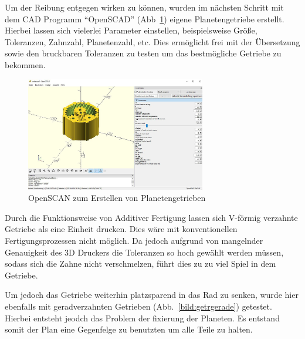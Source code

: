 Um der Reibung entgegen wirken zu können, wurden im nächsten Schritt mit dem CAD Programm ``OpenSCAD'' (Abb~\ref{bild:gearversion2}) eigene Planetengetriebe erstellt.
Hierbei lassen sich vielerlei Parameter einstellen, beispielsweise Größe, Toleranzen, Zahnzahl, Planetenzahl, etc.
Dies ermöglicht frei mit der Übersetzung sowie den bruckbaren Toleranzen zu testen um das bestmögliche Getriebe zu bekommen.
\begin{figure}[!ht]
	\centering
	\includegraphics[width=0.7\textwidth]{bilder/GetriebeVersion2.jpg}
	\caption{OpenSCAN zum Erstellen von Planetengetrieben}
	\label{bild:gearversion2}
\end{figure}

Durch die Funktionsweise von Additiver Fertigung lassen sich V-förmig verzahnte Getriebe als eine Einheit drucken.
Dies wäre mit konventionellen Fertigungsprozessen nicht möglich.
Da jedoch aufgrund von mangelnder Genauigkeit des 3D Druckers die Toleranzen so hoch gewählt werden müssen, 
sodass sich die Zahne nicht verschmelzen, führt dies zu zu viel Spiel in dem Getriebe.

Um jedoch das Getriebe weiterhin platzsparend in das Rad zu senken, wurde hier ebenfalls mit geradverzahnten Getrieben (Abb.~\ref{bild:getrgerade}) getestet.
Hierbei entsteht jeodch das Problem der fixierung der Planeten. Es entstand somit der Plan eine Gegenfelge zu benutzten um alle Teile zu halten.


